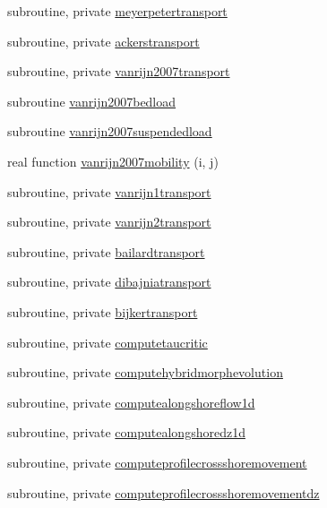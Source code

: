 \begin{DoxyCompactItemize}
subroutine, private \mbox{\hyperlink{namespacemodulesand_a127d449cfb0928af3dd2e7b348aca9cc}{meyerpetertransport}}
\item 
subroutine, private \mbox{\hyperlink{namespacemodulesand_a982128af256cc6018f1c15e9f2bed5ad}{ackerstransport}}
\item 
subroutine, private \mbox{\hyperlink{namespacemodulesand_a86c23492690f1972adf61f7f2b36f027}{vanrijn2007transport}}
\item 
subroutine \mbox{\hyperlink{namespacemodulesand_a977db0c285efea44306fcc4bd320dc10}{vanrijn2007bedload}}
\item 
subroutine \mbox{\hyperlink{namespacemodulesand_ad4f562b0c7304b99b372a946d8cab5b1}{vanrijn2007suspendedload}}
\item 
real function \mbox{\hyperlink{namespacemodulesand_a484efe5d2e2a5463e1f1257ca84852b1}{vanrijn2007mobility}} (i, j)
\item 
subroutine, private \mbox{\hyperlink{namespacemodulesand_abf8eba23882b69da0ba972e0af5b81ad}{vanrijn1transport}}
\item 
subroutine, private \mbox{\hyperlink{namespacemodulesand_afb5faaa6c12c4db3fe47e079018ed0f7}{vanrijn2transport}}
\item 
subroutine, private \mbox{\hyperlink{namespacemodulesand_a93c84a69d793110411e83cb30859f0e3}{bailardtransport}}
\item 
subroutine, private \mbox{\hyperlink{namespacemodulesand_a2daf31a4265bfcae491e0968f275ec7a}{dibajniatransport}}
\item 
subroutine, private \mbox{\hyperlink{namespacemodulesand_ae86fef0e135985c199efb346e08b85dc}{bijkertransport}}
\item 
subroutine, private \mbox{\hyperlink{namespacemodulesand_a59ce9cc4ddca10eedae7fbc2ca0c2583}{computetaucritic}}
\item 
subroutine, private \mbox{\hyperlink{namespacemodulesand_ac778a6b170dc738d265d1108248728f3}{computehybridmorphevolution}}
\item 
subroutine, private \mbox{\hyperlink{namespacemodulesand_a88ad4d02a6e8f1f1c1585f441fd8a910}{computealongshoreflow1d}}
\item 
subroutine, private \mbox{\hyperlink{namespacemodulesand_a608f78fe34da2344f75a4b2f32487eae}{computealongshoredz1d}}
\item 
subroutine, private \mbox{\hyperlink{namespacemodulesand_abe98db28fdf5e787bd658f6e3b181923}{computeprofilecrossshoremovement}}
\item 
subroutine, private \mbox{\hyperlink{namespacemodulesand_a5316ef806da7d9e5bca8d121c7f5fa28}{computeprofilecrossshoremovementdz}}

\end{DoxyCompactItemize}
